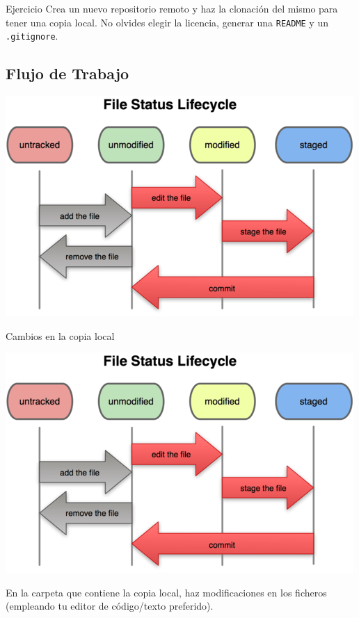 \documentclass[xcolor={usenames,svgnames,dvipsnames}]{beamer}
\begin{document}
\begin{frame}[label={sec:orgbd188fc},fragile]{}
 \begin{block}{Ejercicio}
Crea un nuevo repositorio remoto y haz la clonación del mismo para tener una copia local. No olvides elegir la licencia, generar una \texttt{README} y un \texttt{.gitignore}.
\end{block}
\end{frame}
\subsection{Flujo de Trabajo}
\label{sec:org9669d2b}
\begin{frame}[label={sec:org8a8d41a}]{}
\begin{center}
\includegraphics[width=.9\linewidth]{figs/git_estados.png}
\end{center}
\end{frame}

\begin{frame}[label={sec:orgd18ff3f}]{Cambios en la copia local}
\begin{center}
\includegraphics[height=0.4\textheight]{figs/git_estados.png}
\end{center}

En la carpeta que contiene la copia local, haz \alert{modificaciones} en los ficheros (empleando tu editor de código/texto preferido).
\end{frame}
\end{document}
